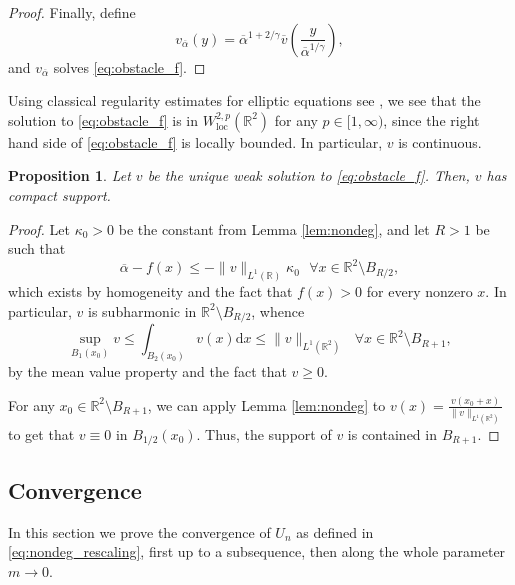 \documentclass[10pt,a4paper]{article}
\newcommand{\loc}{\mathrm{loc}}
\newcommand{\RR}{\mathbb{R}}
\newcommand{\faskip}{\hspace{8pt}}
\newtheorem{prop}[thm]{Proposition}
\numberwithin{equation}{section}
\begin{document}
\begin{proof}
Finally, define
\begin{equation}
	\label{eq:v_rescale}
	v_{\overline{\alpha}}(y) = \overline{\alpha}^{1 + 2/\gamma} \overline{v}\left( \frac{y}{\overline{\alpha}^{1/\gamma}} \right),  
\end{equation}
and $ v_{\overline{\alpha}} $ solves \eqref{eq:obstacle_f}.
\end{proof}

Using classical regularity estimates for elliptic equations see \cite[Theorem 9.11]{GT83}, we see that the solution to \eqref{eq:obstacle_f} is in $ W^{2,p}_{\loc}(\RR^{2}) $ for any $ p\in [1,\infty)$, since the right hand side of \eqref{eq:obstacle_f} is locally bounded. In particular, $ v $ is continuous.

\begin{prop}
	\label{prop:compact}
	Let $v$ be the unique weak solution to \eqref{eq:obstacle_f}. Then, $v$ has compact support.
\end{prop}

\begin{proof}
	Let $\kappa_0 > 0$ be the constant from Lemma \ref{lem:nondeg}, and let $R > 1$ be such that 
	\begin{equation}
	\label{eq:rhs}
	\overline{\alpha} - f(x) \leq -\|v\|_{L^{1}(\RR)} \kappa_0 \faskip \forall x \in \RR^{2}\setminus B_{R/2},
	\end{equation}
	which exists by homogeneity and the fact that $ f(x) > 0 $ for every nonzero $ x $. In particular, $v$ is subharmonic in $ \RR^{2}\setminus B_{R/2} $, whence
	\[ \sup_{B_1(x_0)} v \leq \int_{B_2(x_0)} v(x) \mathrm{d}x\leq \|v\|_{L^{1}(\RR^{2})} \faskip \forall x \in \RR^{2}\setminus B_{R+1}, \]
by the mean value property and the fact that $v\geq 0$. 

	For any $x_0\in \RR^{2}\setminus B_{R+1}$, we can apply Lemma \ref{lem:nondeg} to $ v(x) = \frac{v(x_0 + x)}{\|v\|_{L^{1}(\RR^{2})}} $ to get that $v \equiv 0$ in $B_{1/2}(x_0)$. Thus, the support of $v$ is contained in $B_{R+1}$.
\end{proof}

\subsection{Convergence}
\label{sect:hom_subseq}

In this section we prove the convergence of $ U_n $ as defined in \eqref{eq:nondeg_rescaling}, first up to a subsequence, then along the whole parameter $ m\rightarrow 0 $.
\end{document}
